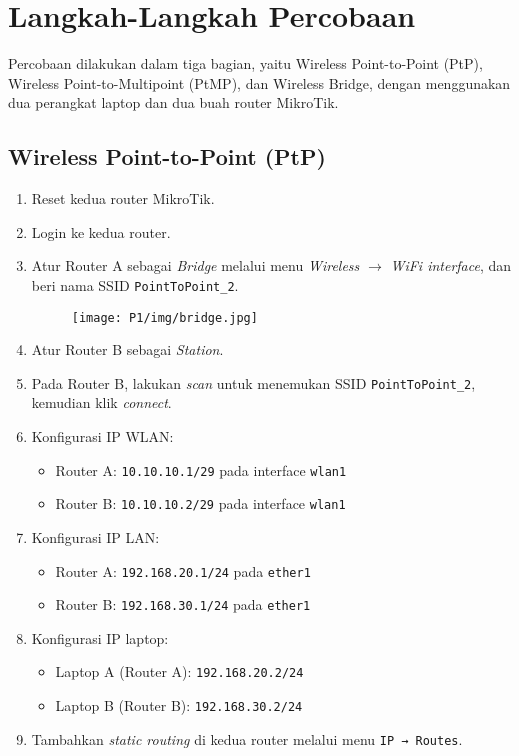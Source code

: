 \section{Langkah-Langkah Percobaan}

Percobaan dilakukan dalam tiga bagian, yaitu Wireless Point-to-Point (PtP), Wireless Point-to-Multipoint (PtMP), dan Wireless Bridge, dengan menggunakan dua perangkat laptop dan dua buah router MikroTik.

\subsection{Wireless Point-to-Point (PtP)}

\begin{enumerate}
  \item Reset kedua router MikroTik.
  \item Login ke kedua router.
  \item Atur Router A sebagai \textit{Bridge} melalui menu \textit{Wireless} $\rightarrow$ \textit{WiFi interface}, dan beri nama SSID \texttt{PointToPoint\_2}.
  
\begin{figure}[H]
    \texttt{[image: P1/img/bridge.jpg]}
\end{figure}

  \item Atur Router B sebagai \textit{Station}.
  \item Pada Router B, lakukan \textit{scan} untuk menemukan SSID \texttt{PointToPoint\_2}, kemudian klik \textit{connect}.
  \item Konfigurasi IP WLAN:
  \begin{itemize}
    \item Router A: \texttt{10.10.10.1/29} pada interface \texttt{wlan1}
    \item Router B: \texttt{10.10.10.2/29} pada interface \texttt{wlan1}
  \end{itemize}
  \item Konfigurasi IP LAN:
  \begin{itemize}
    \item Router A: \texttt{192.168.20.1/24} pada \texttt{ether1}
    \item Router B: \texttt{192.168.30.1/24} pada \texttt{ether1}
  \end{itemize}
  \item Konfigurasi IP laptop:
  \begin{itemize}
    \item Laptop A (Router A): \texttt{192.168.20.2/24}
    \item Laptop B (Router B): \texttt{192.168.30.2/24}
  \end{itemize}
  \item Tambahkan \textit{static routing} di kedua router melalui menu \texttt{IP → Routes}.
  

\end{enumerate}
